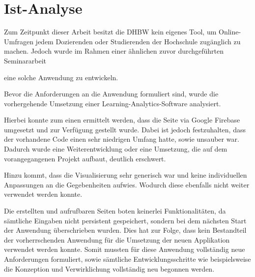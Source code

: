 \section{Ist-Analyse}
\label{sec:IstAnalyse}

Zum Zeitpunkt dieser Arbeit besitzt die \acs{DHBW} kein eigenes Tool, um Online-Umfragen jedem Dozierenden oder Studierenden der Hochschule zugänglich zu machen.
Jedoch wurde im Rahmen einer ähnlichen zuvor durchgeführten Seminararbeit 

eine solche Anwendung zu entwickeln.

Bevor die Anforderungen an die Anwendung formuliert sind, wurde die vorhergehende Umsetzung einer Learning-Analytics-Software analysiert.

Hierbei konnte zum einen ermittelt werden, dass die Seite via Google Firebase umgesetzt und zur Verfügung gestellt wurde.
Dabei ist jedoch festzuhalten, dass der vorhandene Code einen sehr niedrigen Umfang hatte, sowie unsauber war.
Dadurch wurde eine Weiterentwicklung oder eine Umsetzung, die auf dem vorangegangenen Projekt aufbaut, deutlich erschwert.

Hinzu kommt, dass die Visualisierung sehr generisch war und keine individuellen Anpassungen an die Gegebenheiten aufwies. Wodurch diese ebenfalls nicht weiter verwendet werden konnte.

Die erstellten und aufrufbaren Seiten boten keinerlei Funktionalitäten, da sämtliche Eingaben nicht persistent gespeichert, sondern bei dem nächsten Start der Anwendung überschrieben wurden.
Dies hat zur Folge, dass kein Bestandteil der vorherrschenden Anwendung für die Umsetzung der neuen Applikation verwendet werden konnte.
Somit mussten für diese Anwendung vollständig neue Anforderungen formuliert, sowie sämtliche Entwicklungsschritte wie beispielsweise die Konzeption und Verwirklichung vollständig neu begonnen werden.
